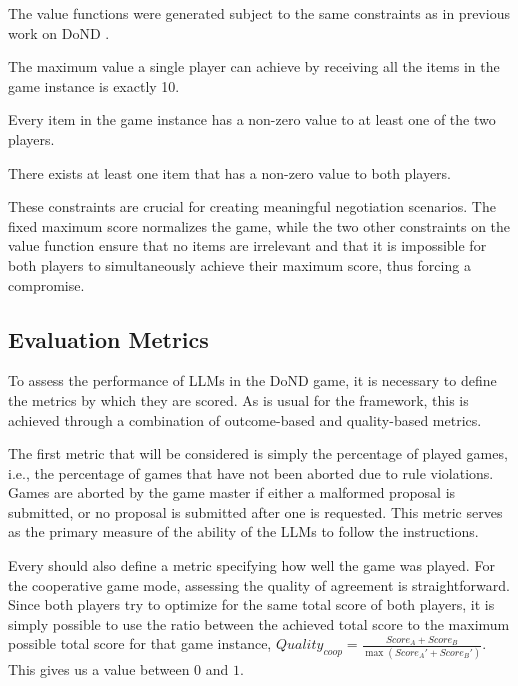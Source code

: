 The value functions were generated subject to the same constraints as in previous work on DoND \cite{liao2024efficacy,lewis2017deal}.
\begin{enumerate*}
    \item The maximum value a single player can achieve by receiving all the items in the game instance is exactly 10.
    \item Every item in the game instance has a non-zero value to at least one of the two players.
    \item There exists at least one item that has a non-zero value to both players.
\end{enumerate*}
These constraints are crucial for creating meaningful negotiation scenarios. The fixed maximum score normalizes the game, while the two other constraints on the value function ensure that no items are irrelevant and that it is impossible for both players to simultaneously achieve their maximum score, thus forcing a compromise.


\subsection{Evaluation Metrics}

To assess the performance of LLMs in the DoND game, it is necessary to define the metrics by which they are scored. As is usual for the  framework, this is achieved through a combination of outcome-based and quality-based metrics.

The first metric that will be considered is simply the percentage of played games, i.e., the percentage of games that have not been aborted due to rule violations. Games are aborted by the game master if either a malformed proposal is submitted, or no proposal is submitted after one is requested. This metric serves as the primary measure of the ability of the LLMs to follow the instructions.

Every  should also define a metric specifying how well the game was played. For the cooperative game mode, assessing the quality of agreement is straightforward. Since both players try to optimize for the same total score of both players, it is simply possible to use the ratio between the achieved total score to the maximum possible total score for that game instance, $\mathit{Quality}_\mathit{coop} = \frac{\mathit{Score}_A + \mathit{Score}_B}{\max ( \mathit{Score}_A' + \mathit{Score}_B' )}$. This gives us a value between $0$ and $1$.

